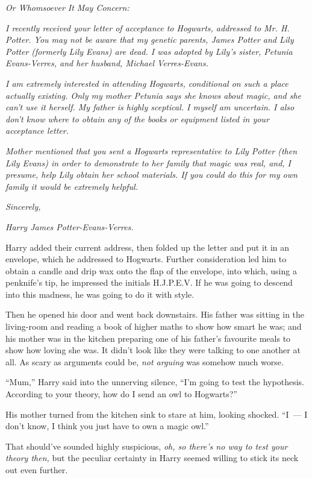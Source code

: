\emph{Or Whomsoever It May Concern:}

\emph{I recently received your letter of acceptance to Hogwarts, addressed to Mr. H. Potter. You may not be aware that my genetic parents, James Potter and Lily Potter (formerly Lily Evans) are dead. I was adopted by Lily's sister, Petunia Evans-Verres, and her husband, Michael Verres-Evans.}

\emph{I am extremely interested in attending Hogwarts, conditional on such a place actually existing. Only my mother Petunia says she knows about magic, and she can't use it herself. My father is highly sceptical. I myself am uncertain. I also don't know where to obtain any of the books or equipment listed in your acceptance letter.}

\emph{Mother mentioned that you sent a Hogwarts representative to Lily Potter (then Lily Evans) in order to demonstrate to her family that magic was real, and, I presume, help Lily obtain her school materials. If you could do this for my own family it would be extremely helpful.}

\emph{Sincerely,}

\emph{Harry James Potter-Evans-Verres.}

Harry added their current address, then folded up the letter and put it in an envelope, which he addressed to Hogwarts. Further consideration led him to obtain a candle and drip wax onto the flap of the envelope, into which, using a penknife's tip, he impressed the initials H.J.P.E.V. If he was going to descend into this madness, he was going to do it with style.

Then he opened his door and went back downstairs. His father was sitting in the living-room and reading a book of higher maths to show how smart he was; and his mother was in the kitchen preparing one of his father's favourite meals to show how loving she was. It didn't look like they were talking to one another at all. As scary as arguments could be, \emph{not arguing} was somehow much worse.

``Mum,'' Harry said into the unnerving silence, ``I'm going to test the hypothesis. According to your theory, how do I send an owl to Hogwarts?''

His mother turned from the kitchen sink to stare at him, looking shocked. ``I~--- I don't know, I think you just have to own a magic owl.''

That should've sounded highly suspicious, \emph{oh, so there's no way to test your theory then,} but the peculiar certainty in Harry seemed willing to stick its neck out even further.

